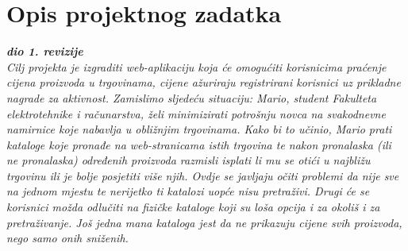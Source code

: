 \chapter{Opis projektnog zadatka}
		
		\textbf{\textit{dio 1. revizije}}\\
		
		
		\textit{Cilj projekta je izgraditi web-aplikaciju koja će omogućiti korisnicima praćenje cijena proizvoda u trgovinama, cijene ažuriraju registrirani korisnici uz prikladne nagrade za aktivnost. Zamislimo sljedeću situaciju: Mario, student Fakulteta elektrotehnike i računarstva, želi minimizirati potrošnju novca na svakodnevne namirnice koje nabavlja u obližnjim trgovinama. Kako bi to učinio, Mario prati kataloge koje pronađe na web-stranicama istih trgovina te nakon pronalaska (ili ne pronalaska) određenih proizvoda razmisli isplati li mu se otići u najbližu trgovinu ili je bolje posjetiti više njih. Ovdje se javljaju očiti problemi da nije sve na jednom mjestu te nerijetko ti katalozi uopće nisu pretraživi. Drugi će se korisnici možda odlučiti na fizičke kataloge koji su loša opcija i za okoliš i za pretraživanje. Još jedna mana kataloga jest da ne prikazuju cijene svih proizvoda, nego samo onih sniženih.}\\
		
